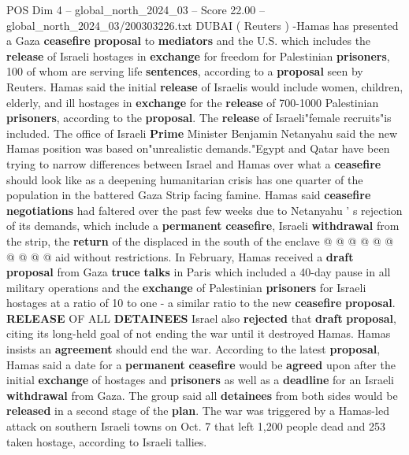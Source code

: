 \begin{textsample}{POS Dim 4 – global\_north\_2024\_03 – Score 22.00 – global\_north\_2024\_03/200303226.txt}  \label{ex:f4_pos_231}
DUBAI ( Reuters ) -Hamas has presented a Gaza \textbf{ceasefire} \textbf{proposal} to \textbf{mediators} and the U.S. which includes the \textbf{release} of Israeli hostages in \textbf{exchange} for freedom for Palestinian \textbf{prisoners}, 100 of whom are serving life \textbf{sentences}, according to a \textbf{proposal} seen by Reuters.
Hamas said the initial \textbf{release} of Israelis would include women, children, elderly, and ill hostages in \textbf{exchange} for the \textbf{release} of 700-1000 Palestinian \textbf{prisoners}, according to the \textbf{proposal}.
The \textbf{release} of Israeli"female recruits"is included.
The office of Israeli \textbf{Prime} Minister Benjamin Netanyahu said the new Hamas position was based on"unrealistic demands."Egypt and Qatar have been trying to narrow differences between Israel and Hamas over what a \textbf{ceasefire} should look like as a deepening humanitarian crisis has one quarter of the population in the battered Gaza Strip facing famine.
Hamas said \textbf{ceasefire} \textbf{negotiations} had faltered over the past few weeks due to Netanyahu ' s rejection of its demands, which include a \textbf{permanent} \textbf{ceasefire}, Israeli \textbf{withdrawal} from the strip, the \textbf{return} of the displaced in the south of the enclave @ @ @ @ @ @ @ @ @ @ aid without restrictions.
In February, Hamas received a \textbf{draft} \textbf{proposal} from Gaza \textbf{truce} \textbf{talks} in Paris which included a 40-day pause in all military operations and the \textbf{exchange} of Palestinian \textbf{prisoners} for Israeli hostages at a ratio of 10 to one - a similar ratio to the new \textbf{ceasefire} \textbf{proposal}. \textbf{RELEASE} OF ALL \textbf{DETAINEES} Israel also \textbf{rejected} that \textbf{draft} \textbf{proposal}, citing its long-held goal of not ending the war until it destroyed Hamas.
Hamas insists an \textbf{agreement} should end the war.
According to the latest \textbf{proposal}, Hamas said a date for a \textbf{permanent} \textbf{ceasefire} would be \textbf{agreed} upon after the initial \textbf{exchange} of hostages and \textbf{prisoners} as well as a \textbf{deadline} for an Israeli \textbf{withdrawal} from Gaza.
The group said all \textbf{detainees} from both sides would be \textbf{released} in a second stage of the \textbf{plan}.
The war was triggered by a Hamas-led attack on southern Israeli towns on Oct. 7 that left 1,200 people dead and 253 taken hostage, according to Israeli tallies.

\end{textsample}
